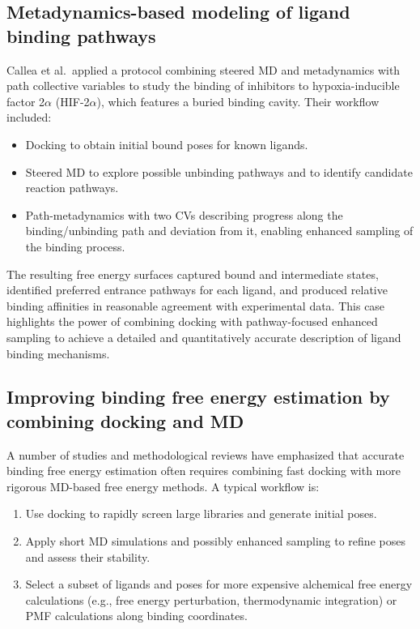\documentclass[12pt,a4paper]{article}
\begin{document}
\subsection{Metadynamics-based modeling of ligand binding pathways}

Callea et al.\ applied a protocol combining steered MD and metadynamics with path collective variables to study the binding of inhibitors to hypoxia-inducible factor 2\(\alpha\) (HIF-2\(\alpha\)), which features a buried binding cavity.\cite{Callea2021} Their workflow included:

\begin{itemize}
\item Docking to obtain initial bound poses for known ligands.
\item Steered MD to explore possible unbinding pathways and to identify candidate reaction pathways.
\item Path-metadynamics with two CVs describing progress along the binding/unbinding path and deviation from it, enabling enhanced sampling of the binding process.
\end{itemize}

The resulting free energy surfaces captured bound and intermediate states, identified preferred entrance pathways for each ligand, and produced relative binding affinities in reasonable agreement with experimental data.\cite{Callea2021} This case highlights the power of combining docking with pathway-focused enhanced sampling to achieve a detailed and quantitatively accurate description of ligand binding mechanisms.

\subsection{Improving binding free energy estimation by combining docking and MD}

A number of studies and methodological reviews have emphasized that accurate binding free energy estimation often requires combining fast docking with more rigorous MD-based free energy methods.\cite{Cournia2017,Min2023} A typical workflow is:

\begin{enumerate}
\item Use docking to rapidly screen large libraries and generate initial poses.
\item Apply short MD simulations and possibly enhanced sampling to refine poses and assess their stability.
\item Select a subset of ligands and poses for more expensive alchemical free energy calculations (e.g., free energy perturbation, thermodynamic integration) or PMF calculations along binding coordinates.
\end{enumerate}
\end{document}
